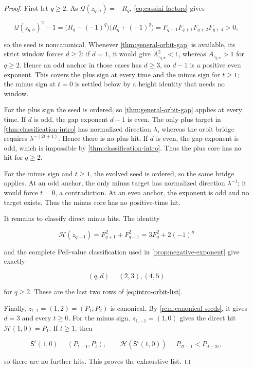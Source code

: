 \begin{proof}
First let $q\geqslant2$. As $\mathcal Q(z_{q,\sigma})=-R_q$,
\cref{eq:cassini-factors} gives

\begin{equation}
 \mathcal Q(z_{q,\sigma})^2-1
 =\bigl(R_q-(-1)^q\bigr)\bigl(R_q+(-1)^q\bigr)
 =F_{q-1}F_{q+1}F_{q+2}F_{q+4}>0,
 \label{eq:core-noncanonical}
\end{equation}

so the seed is noncanonical. Whenever
\cref{thm:general-orbit-gap} is available, its strict window forces
$d\geqslant2$: if $d=1$, it would give
$A_{z_{q,\sigma}}^2<1$, whereas $A_{z_{q,\sigma}}>1$ for
$q\geqslant2$. Hence an odd anchor in those cases has $d\geqslant3$, so
$d-1$ is a positive even exponent. This covers the plus sign at every time
and the minus sign for $t\geqslant1$; the minus sign at $t=0$ is settled
below by a height identity that needs no window.

For the plus sign the seed is ordered, so
\cref{thm:general-orbit-gap} applies at every time. If $d$ is odd, the gap
exponent $d-1$ is even. The only plus target in
\cref{thm:classification-intro} has normalized direction $\lambda$, whereas
the orbit bridge requires $\lambda^{-(2t+1)}$. Hence there is no plus hit.
If $d$ is even, the gap exponent is odd, which is impossible by
\cref{thm:classification-intro}. Thus the plus core has no hit for
$q\geqslant2$.

For the minus sign and $t\geqslant1$, the evolved seed is ordered, so the
same bridge applies. At an odd anchor, the only minus target has normalized
direction $\lambda^{-1}$; it would force $t=0$, a contradiction. At an even
anchor, the exponent is odd and no target exists. Thus the minus core has no
positive-time hit.

It remains to classify direct minus hits. The identity

\begin{equation}
 \mathcal H(z_{q,-1})
 =F_{q+1}^2+F_{q-1}^2
 =3F_q^2+2(-1)^q
 \label{eq:minus-direct-height}
\end{equation}

and the complete Pell-value classification used in
\cref{prop:negative-exponent} give exactly

\begin{equation}
 (q,d)=(2,3),(4,5)
 \label{eq:minus-direct-hits}
\end{equation}

for $q\geqslant2$. These are the last two rows of
\cref{eq:intro-orbit-list}.

Finally, $z_{1,1}=(1,2)=(P_1,P_2)$ is canonical. By
\cref{rem:canonical-seeds}, it gives $d=3$ and every $t\geqslant0$.
For the minus sign, $z_{1,-1}=(1,0)$ gives the direct hit
$\mathcal H(1,0)=P_1$. If $t\geqslant1$, then

\begin{equation}
 \mathsf S^t(1,0)=(P_{t-1},P_t),
 \qquad
 \mathcal H(\mathsf S^t(1,0))=P_{2t-1}<P_{d+2t},
\end{equation}

so there are no further hits. This proves the exhaustive list.
\end{proof}

